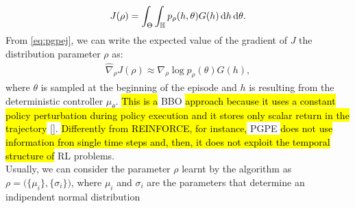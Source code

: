 \begin{align}
J(\rho) = \int_{\Theta} \int_{\mathbb{H}} p_{\rho}(h, \theta) G(h) \,\mathrm{d} h \,\mathrm{d} \theta. \label{eq:pgpej}
\end{align}
From \ref{eq:pgpej}, we can write the expected value of the gradient of $J$ \wrt the distribution parameter $\rho$ as:
\begin{align}
\widehat{\nabla}_{\rho}J(\rho) \approx \nabla_{\rho} \log p_{\rho} (\theta) G(h),
\end{align}
where $\theta$ is sampled at the beginning of the episode and $h$ is resulting from the deterministic controller $\mu_{\theta}$. \hl{This is a} \acf{BBO} \hl{approach because it uses a constant policy perturbation during policy execution and it stores only scalar return in the trajectory} [\cite{stulp2012pol}]. \hl{Differently from REINFORCE, for instance,} \ac{PGPE} \hl{does not use information fron single time steps and, then, it does not exploit the temporal structure of} \ac{RL} problems.\\
\newline
Usually, we can consider the parameter $\rho$ learnt by the algorithm as $\rho = \Big( \{\mu_i\}, \{\sigma_i\} \Big)$, where $\mu_i$ and $\sigma_i$ are the parameters that determine an indipendent normal distribution
